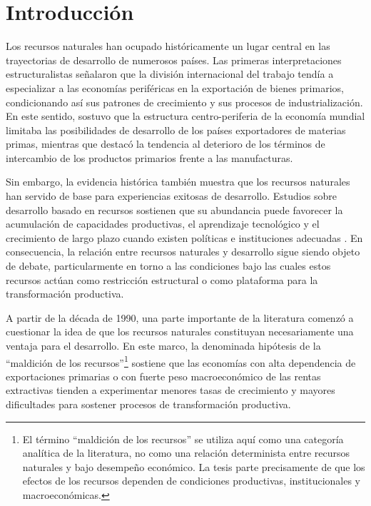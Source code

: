 \documentclass[../../PTFM.tex]{subfiles}
\begin{document}
	\chapter{Introducción}
	\label{chap:introduccion}

	Los recursos naturales han ocupado históricamente un lugar central en las trayectorias de desarrollo de numerosos países. Las primeras interpretaciones estructuralistas señalaron que la división internacional del trabajo tendía a especializar a las economías periféricas en la exportación de bienes primarios, condicionando así sus patrones de crecimiento y sus procesos de industrialización. En este sentido, \textcite{Prebisch1962} sostuvo que la estructura centro-periferia de la economía mundial limitaba las posibilidades de desarrollo de los países exportadores de materias primas, mientras que \textcite{Singer1975} destacó la tendencia al deterioro de los términos de intercambio de los productos primarios frente a las manufacturas.

	Sin embargo, la evidencia histórica también muestra que los recursos naturales han servido de base para experiencias exitosas de desarrollo. Estudios sobre desarrollo basado en recursos sostienen que su abundancia puede favorecer la acumulación de capacidades productivas, el aprendizaje tecnológico y el crecimiento de largo plazo cuando existen políticas e instituciones adecuadas \parencite{Wright2004,Ville2013}. En consecuencia, la relación entre recursos naturales y desarrollo sigue siendo objeto de debate, particularmente en torno a las condiciones bajo las cuales estos recursos actúan como restricción estructural o como plataforma para la transformación productiva.

	A partir de la década de 1990, una parte importante de la literatura comenzó a cuestionar la idea de que los recursos naturales constituyan necesariamente una ventaja para el desarrollo. En este marco, la denominada hipótesis de la ``maldición de los recursos''\footnote{El término ``maldición de los recursos'' se utiliza aquí como una categoría analítica de la literatura, no como una relación determinista entre recursos naturales y bajo desempeño económico. La tesis parte precisamente de que los efectos de los recursos dependen de condiciones productivas, institucionales y macroeconómicas.} sostiene que las economías con alta dependencia de exportaciones primarias o con fuerte peso macroeconómico de las rentas extractivas tienden a experimentar menores tasas de crecimiento y mayores dificultades para sostener procesos de transformación productiva.
\end{document}
